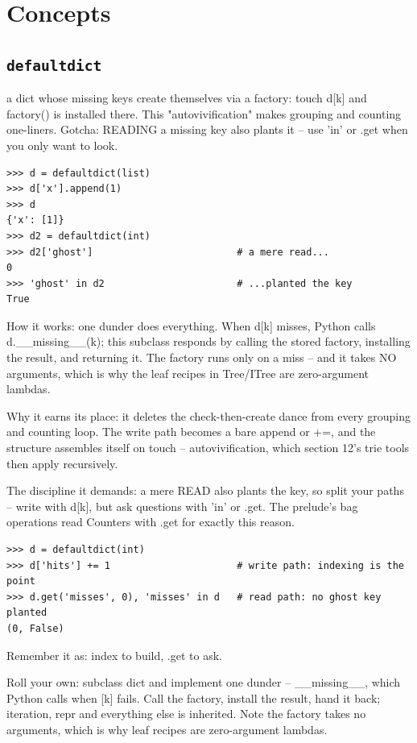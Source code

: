 \documentclass[10pt,letterpaper]{book}
\begin{document}
\section{Concepts}
\subsection{\texttt{defaultdict}}\label{def:defaultdict}
a dict whose missing keys create themselves via a factory: touch d[k] and factory() is installed there. This "autovivification" makes grouping and counting one-liners. Gotcha: READING a missing key also plants it -- use 'in' or .get when you only want to look.
\begin{lstlisting}[style=ex]
>>> d = defaultdict(list)
>>> d['x'].append(1)
>>> d
{'x': [1]}
>>> d2 = defaultdict(int)
>>> d2['ghost']                         # a mere read...
0
>>> 'ghost' in d2                       # ...planted the key
True
\end{lstlisting}

How it works: one dunder does everything. When d[k] misses, Python calls d.\_\_missing\_\_(k); this subclass responds by calling the stored factory, installing the result, and returning it. The factory runs only on a miss -- and it takes NO arguments, which is why the leaf recipes in Tree/ITree are zero-argument lambdas.


Why it earns its place: it deletes the check-then-create dance from every grouping and counting loop. The write path becomes a bare append or +=, and the structure assembles itself on touch -- autovivification, which section 12's trie tools then apply recursively.


The discipline it demands: a mere READ also plants the key, so split your paths -- write with d[k], but ask questions with 'in' or .get. The prelude's bag operations read Counters with .get for exactly this reason.

\begin{lstlisting}[style=ex]
>>> d = defaultdict(int)
>>> d['hits'] += 1                      # write path: indexing is the point
>>> d.get('misses', 0), 'misses' in d   # read path: no ghost key planted
(0, False)
\end{lstlisting}

Remember it as: index to build, .get to ask.


Roll your own: subclass dict and implement one dunder -- \_\_missing\_\_, which Python calls when [k] fails. Call the factory, install the result, hand it back; iteration, repr and everything else is inherited. Note the factory takes no arguments, which is why leaf recipes are zero-argument lambdas.
\end{document}
